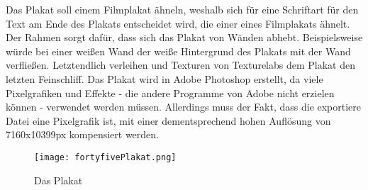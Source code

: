 Das
Plakat soll einem Filmplakat ähneln, weshalb sich für eine Schriftart für den Text am Ende des Plakats entscheidet wird, die einer eines Filmplakats ähnelt. Der Rahmen sorgt dafür, dass sich das Plakat von Wänden abhebt. Beispielsweise würde bei einer weißen Wand der weiße Hintergrund des Plakats mit der Wand verfließen. Letztendlich verleihen
 und  Texturen von Texturelabs dem Plakat den letzten Feinschliff. Das Plakat wird in Adobe Photoshop erstellt, da viele Pixelgrafiken und Effekte - die andere Programme von Adobe nicht erzielen können - verwendet werden müssen. Allerdings muss der Fakt, dass die exportiere Datei eine Pixelgrafik ist, mit einer dementsprechend hohen Auflösung von 7160x10399px kompensiert werden.

\begin{figure}[H]
    \centering
    \texttt{[image: fortyfivePlakat.png]}
    \caption{Das \FF Plakat}
\end{figure}

\renewcommand{\kapitelautor}{}